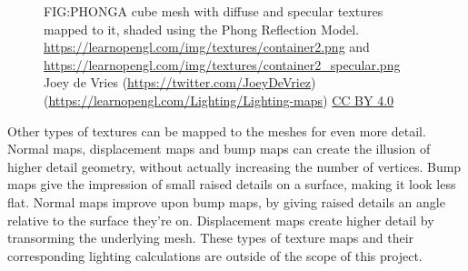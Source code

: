 \begin{figure}[Phong lighting with texture mapping]{FIG:PHONG}{A cube mesh with diffuse and specular textures mapped to it, shaded using the Phong Reflection Model. \url{https://learnopengl.com/img/textures/container2.png} and \url{https://learnopengl.com/img/textures/container2_specular.png} \textcopyright Joey de Vries (\url{https://twitter.com/JoeyDeVriez}) (\url{https://learnopengl.com/Lighting/Lighting-maps}) \href{https://creativecommons.org/licenses/by/4.0/legalcode}{CC BY 4.0} }
\end{figure}

Other types of textures can be mapped to the meshes for even more detail.
Normal maps,
displacement maps and bump maps can create the illusion of higher detail geometry,
without actually increasing the number of vertices.
Bump maps give the impression of small raised details on a surface,
making it look less flat.
Normal maps improve upon bump maps,
by giving raised details an angle relative to the surface they're on.
Displacement maps create higher detail by transorming the underlying mesh.
These types of texture maps and their corresponding lighting calculations are outside of the scope of this project.
